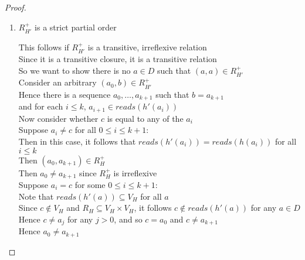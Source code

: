 \begin{proof}
\begin{enumerate}
\item $R^+_{H'}$ is a strict partial order 
  \begin{tabbedproof}
    \oo This follows if $R^+_{H'}$ is a transitive, irreflexive relation \\
    \oo Since it is a transitive closure, it is a transitive relation \\
    \oo So we want to show there is no $a \in D$ such that $(a,a) \in R^+_{H'}$ \\
    \oo Consider an arbitrary $(a_0, b) \in R^+_{H'}$ \\
    \oo Hence there is a sequence $a_0, \ldots, a_{k+1}$ such that $b = a_{k+1}$ \\
    \ox and for each $i \leq k$, $a_{i+1} \in \mathit{reads}(h'(a_i))$ \\
    \oo Now consider whether $c$ is equal to any of the $a_i$ \\
    \oo Suppose $a_i \not= c$ for all $0 \leq i \leq k+1$: \\
    \ooo Then in this case, it follows that $\mathit{reads}(h'(a_i)) = \mathit{reads}(h(a_i))$ for all $i \leq k$\\
    \ooo Then $(a_0, a_{k+1}) \in R^+_H$ \\
    \ooo Then $a_0 \not= a_{k+1}$ since $R^+_H$ is irreflexive \\
    \oo Suppose $a_i = c$ for some $0 \leq i \leq k+1$: \\
    \ooo Note that $\mathit{reads}(h'(a)) \subseteq V_H$ for all $a$  \\
    \ooo Since $c \not\in V_H$ and $R_H \subseteq V_H \times V_H$, it follows $c \not\in \mathit{reads}(h'(a))$ for any $a \in D$ \\
    \ooo Hence $c \not= a_j$ for any $j > 0$, and so $c = a_0$ and $c \not= a_{k+1}$\\
    \ooo Hence $a_0 \not= a_{k+1}$
  \end{tabbedproof}


\end{enumerate}
\end{proof}
